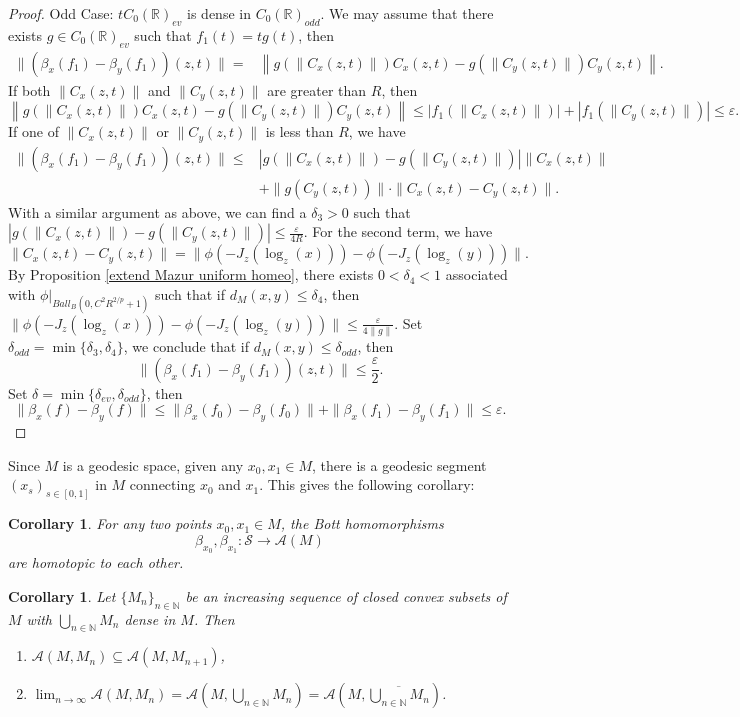 \documentclass{article}
\theoremstyle{plain}
\newtheorem{corollary}[theorem]{Corollary}
\theoremstyle{definition}
\theoremstyle{remark}
\def\A{\mathcal A}
\def\IR{\mathbb R}
\def\IN{\mathbb N}
\def\S{\mathcal S}
\begin{document}
\begin{proof}
		Odd Case: $tC_0(\IR)_{ev}$ is dense in $C_0(\IR)_{odd}$. We may assume that there exists $g\in C_0(\IR)_{ev}$ such that $f_1(t)=tg(t)$, then
		\begin{equation*}\begin{split}
				\|(\beta_x(f_1)-\beta_y(f_1))(z,t)\|=&\left\|g(\|C_x(z,t)\|)C_x(z,t)-g(\|C_y(z,t)\|)C_y(z,t)\right\|.
		\end{split}\end{equation*}
		If both $\|C_x(z,t)\|$ and $\|C_y(z,t)\|$ are greater than $R$, then
		$$\left\|g(\|C_x(z,t)\|)C_x(z,t)-g(\|C_y(z,t)\|)C_y(z,t)\right\|\leq |f_1(\|C_x(z,t)\|)|+|f_1(\|C_y(z,t)\|)|\leq\varepsilon.$$
		If one of $\|C_x(z,t)\|$ or $\|C_y(z,t)\|$ is less than $R$, we have	
		\begin{equation*}\begin{split}
				\|(\beta_x(f_1)-\beta_y(f_1))(z,t)\|\leq&|g(\|C_x(z,t)\|)-g(\|C_y(z,t)\|)|\left\|C_x(z,t)\right\|\\
				&+\|g(C_y(z,t))\|\cdot\|C_x(z,t)-C_y(z,t)\|.
		\end{split}\end{equation*} 
		With a similar argument as above, we can find a $\delta_3>0$ such that $|g(\|C_x(z,t)\|)-g(\|C_y(z,t)\|)|\leq \frac \varepsilon{4R}$. For the second term, we have
		$$\|C_x(z,t)-C_y(z,t)\|=\|\phi(-J_z(\log_z(x)))-\phi(-J_z(\log_z(y)))\|.$$
		By Proposition \ref{extend Mazur uniform homeo}, there exists $0<\delta_4<1$ associated with $\phi|_{Ball_B(0,C^2R^{2/p}+1)}$ such that if $d_M(x,y)\leq \delta_4$, then $\|\phi(-J_z(\log_z(x)))-\phi(-J_z(\log_z(y)))\|\leq\frac\varepsilon{4\|g\|}$. Set $\delta_{odd}=\min\{\delta_3,\delta_4\}$, we conclude that if $d_M(x,y)\leq\delta_{odd}$, then
		$$\|(\beta_x(f_1)-\beta_y(f_1))(z,t)\|\leq\frac\varepsilon2.$$
		Set $\delta=\min\{\delta_{ev},\delta_{odd}\}$, then
		$$\|\beta_x(f)-\beta_y(f)\|\leq\|\beta_x(f_0)-\beta_y(f_0)\|+\|\beta_x(f_1)-\beta_y(f_1)\|\leq\varepsilon.$$
	\end{proof}
	Since $M$ is a geodesic space, given any $x_0,x_1\in M$, there is a geodesic segment $(x_s)_{s\in [0,1]}$ in $M$ connecting $x_0$ and $x_1$. This gives the following corollary: 
	\begin{corollary}\label{bott-homotopy}
		For any two points $x_0, x_1 \in M$, the Bott homomorphisms
		\[
		\beta_{x_0}, \beta_{x_1} \colon \S \to \A(M)
		\]
		are homotopic to each other. 
	\end{corollary}
	\begin{corollary}\label{directlimit}
		Let $\{M_n\}_{n\in\IN}$ be an increasing sequence of closed convex subsets of $M$ with $\bigcup_{n\in\IN}M_n$ dense in $M$. Then
		\begin{enumerate}
			\item[(1)] $\A(M,M_n)\subseteq\A(M,M_{n+1})$,
			\item[(2)] $\lim_{n\to\infty}\A(M,M_n)=\A(M,\bigcup_{n\in\IN}M_n)=\A(M,\overline{\bigcup_{n\in\IN}M_n})$.
		\end{enumerate}
	\end{corollary}
	
\end{document}
